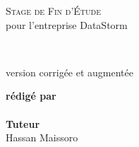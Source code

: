 \begin{titlepage}

	\begin{center}

		

		\textsc{\LARGE Stage de Fin d'Étude }\\[0.5cm]
		{\Large pour l'entreprise DataStorm}\\ [1cm]

		\HRule%
		\vspace{0.4cm}

		{\huge \bfseries \articletitle}\\[0.4cm]
		
		\HRule%
		\vspace{1.5cm}

		version corrigée et augmentée

	\vfill
	\end{center}
	
	
	
	\begin{flushright} \Large
		\textbf{rédigé par}%
		\\
		\auteur%
		\\
		\textbf{Tuteur}%
		\\
		Hassan Maissoro
	\end{flushright}



	\begin{center}
		{\large{\customdate}}
	\end{center}
\end{titlepage}
